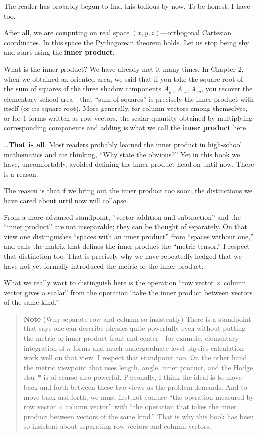 The reader has probably begun to find this tedious by now. To be honest,
I have too.

After all, we are computing on real space \((x,y,z)\)---orthogonal
Cartesian coordinates. In this space the Pythagorean theorem holds. Let
us stop being shy and start using the \textbf{inner product}.

What is the inner product? We have already met it many times. In Chapter
2, when we obtained an oriented area, we said that if you take the
square root of the sum of squares of the three shadow components
\(A_{yz}, A_{zx}, A_{xy}\), you recover the elementary-school
area---that ``sum of squares'' is precisely the inner product with
itself (or its square root). More generally, for column vectors among
themselves, or for \(1\)-forms written as row vectors, the scalar
quantity obtained by multiplying corresponding components and adding is
what we call the \textbf{inner product} here.

\ldots{}\textbf{That is all}. Most readers probably learned the inner
product in high-school mathematics and are thinking, ``Why state the
obvious?'' Yet in this book we have, uncomfortably, avoided defining the
inner product head-on until now. There is a reason.

The reason is that if we bring out the inner product too soon, the
distinctions we have cared about until now will collapse.

From a more advanced standpoint, ``vector addition and subtraction'' and
the ``inner product'' are not inseparable; they can be thought of
separately. On that view one distinguishes ``spaces with an inner
product'' from ``spaces without one,'' and calls the matrix that defines
the inner product the ``metric tensor.'' I respect that distinction too.
That is precisely why we have repeatedly hedged that we have not yet
formally introduced the metric or the inner product.

What we really want to distinguish here is the operation ``row vector ×
column vector gives a scalar'' from the operation ``take the inner
product between vectors of the same kind.''

\begin{quote}
\textbf{Note} (Why separate row and column so insistently) There is a
standpoint that says one can describe physics quite powerfully even
without putting the metric or inner product front and center---for
example, elementary integration of \(n\)-forms and much
undergraduate-level physics calculation work well on that view. I
respect that standpoint too. On the other hand, the metric viewpoint
that uses length, angle, inner product, and the Hodge star \(\ast\) is
of course also powerful. Personally, I think the ideal is to move back
and forth between these two views as the problem demands. And to move
back and forth, we must first not confuse ``the operation measured by
row vector × column vector'' with ``the operation that takes the inner
product between vectors of the same kind.'' That is why this book has
been so insistent about separating row vectors and column vectors.
\end{quote}

